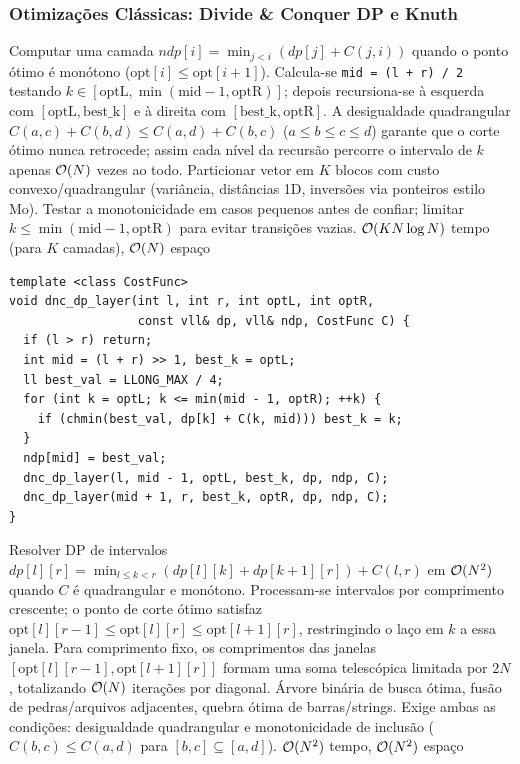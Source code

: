 \subsubsection{Otimizações Clássicas: Divide \& Conquer DP e Knuth}
\algobox
  {Computar uma camada $ndp[i] = \min_{j < i}(dp[j] + C(j, i))$ quando o ponto ótimo é monótono ($\text{opt}[i] \le \text{opt}[i+1]$).}
  {Calcula-se \texttt{mid = (l + r) / 2} testando $k \in [\text{optL}, \min(\text{mid} - 1, \text{optR})]$; depois recursiona-se à esquerda com $[\text{optL}, \text{best\_k}]$ e à direita com $[\text{best\_k}, \text{optR}]$.}
  {A desigualdade quadrangular $C(a, c) + C(b, d) \le C(a, d) + C(b, c)$ ($a \le b \le c \le d$) garante que o corte ótimo nunca retrocede; assim cada nível da recursão percorre o intervalo de $k$ apenas $\mathcal{O}(N)$ vezes ao todo.}
  {Particionar vetor em $K$ blocos com custo convexo/quadrangular (variância, distâncias 1D, inversões via ponteiros estilo Mo).}
  {Testar a monotonicidade em casos pequenos antes de confiar; limitar $k \le \min(\text{mid} - 1, \text{optR})$ para evitar transições vazias.}
  {$\mathcal{O}(K N \log N)$ tempo (para $K$ camadas), $\mathcal{O}(N)$ espaço}

\begin{lstlisting}
template <class CostFunc>
void dnc_dp_layer(int l, int r, int optL, int optR,
                  const vll& dp, vll& ndp, CostFunc C) {
  if (l > r) return;
  int mid = (l + r) >> 1, best_k = optL;
  ll best_val = LLONG_MAX / 4;
  for (int k = optL; k <= min(mid - 1, optR); ++k) {
    if (chmin(best_val, dp[k] + C(k, mid))) best_k = k;
  }
  ndp[mid] = best_val;
  dnc_dp_layer(l, mid - 1, optL, best_k, dp, ndp, C);
  dnc_dp_layer(mid + 1, r, best_k, optR, dp, ndp, C);
}
\end{lstlisting}

\algobox
  {Resolver DP de intervalos $dp[l][r] = \min_{l \le k < r}(dp[l][k] + dp[k+1][r]) + C(l, r)$ em $\mathcal{O}(N^2)$ quando $C$ é quadrangular e monótono.}
  {Processam-se intervalos por comprimento crescente; o ponto de corte ótimo satisfaz $\text{opt}[l][r-1] \le \text{opt}[l][r] \le \text{opt}[l+1][r]$, restringindo o laço em $k$ a essa janela.}
  {Para comprimento fixo, os comprimentos das janelas $[\text{opt}[l][r-1], \text{opt}[l+1][r]]$ formam uma soma telescópica limitada por $2N$, totalizando $\mathcal{O}(N)$ iterações por diagonal.}
  {Árvore binária de busca ótima, fusão de pedras/arquivos adjacentes, quebra ótima de barras/strings.}
  {Exige ambas as condições: desigualdade quadrangular e monotonicidade de inclusão ($C(b, c) \le C(a, d)$ para $[b, c] \subseteq [a, d]$).}
  {$\mathcal{O}(N^2)$ tempo, $\mathcal{O}(N^2)$ espaço}

